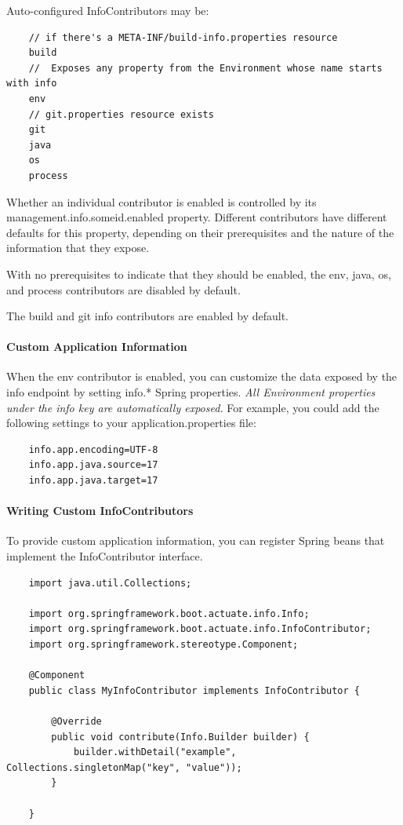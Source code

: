 \documentclass{scrartcl}
\begin{document}
Auto-configured InfoContributors may be:

\begin{lstlisting}
    // if there's a META-INF/build-info.properties resource
    build
    //  Exposes any property from the Environment whose name starts with info
    env
    // git.properties resource exists
    git
    java
    os
    process
\end{lstlisting}

Whether an individual contributor is enabled is controlled by its management.info.someid.enabled property.
Different contributors have different defaults for this property, depending on their prerequisites and the nature of the information that they expose.

With no prerequisites to indicate that they should be enabled, the env, java, os, and process contributors are disabled by default.

The build and git info contributors are enabled by default.

\paragraph{Custom Application Information}

When the env contributor is enabled, you can customize the data exposed by the info endpoint by setting info.* Spring properties. \textit{All Environment properties under the info key are automatically exposed.} For example, you could add the following settings to your application.properties file:

    \begin{lstlisting}
    info.app.encoding=UTF-8
    info.app.java.source=17
    info.app.java.target=17

    \end{lstlisting}

\paragraph{Writing Custom InfoContributors}

    To provide custom application information, you can register Spring beans that implement the InfoContributor interface.

\begin{lstlisting}
    import java.util.Collections;

    import org.springframework.boot.actuate.info.Info;
    import org.springframework.boot.actuate.info.InfoContributor;
    import org.springframework.stereotype.Component;

    @Component
    public class MyInfoContributor implements InfoContributor {

        @Override
        public void contribute(Info.Builder builder) {
            builder.withDetail("example", Collections.singletonMap("key", "value"));
        }

    }
\end{lstlisting}
\end{document}
